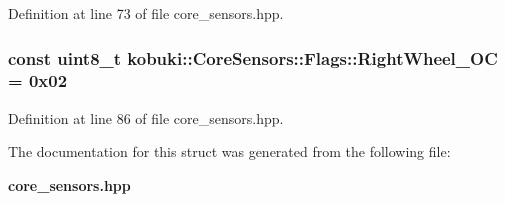 \-Definition at line 73 of file core\-\_\-sensors.\-hpp.

\subsubsection[{\-Right\-Wheel\-\_\-\-O\-C}]{\setlength{\rightskip}{0pt plus 5cm}const uint8\-\_\-t {\bf kobuki\-::\-Core\-Sensors\-::\-Flags\-::\-Right\-Wheel\-\_\-\-O\-C} = 0x02\hspace{0.3cm}{\ttfamily  [static]}}\label{structkobuki_1_1CoreSensors_1_1Flags_acd0f2a4e0f3bc264289ebc67f7ef4316}


\-Definition at line 86 of file core\-\_\-sensors.\-hpp.



\-The documentation for this struct was generated from the following file\-:\begin{DoxyCompactItemize}
\item 
{\bf core\-\_\-sensors.\-hpp}\end{DoxyCompactItemize}
